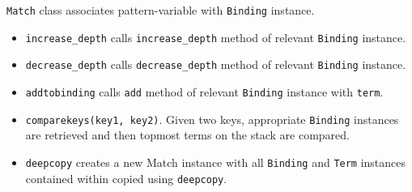 \texttt{Match} class associates pattern-variable with \texttt{Binding} instance.

\begin{itemize}
\item
\texttt{increase\_depth} calls \texttt{increase\_depth} method of relevant \texttt{Binding} instance.

\item
\texttt{decrease\_depth} calls \texttt{decrease\_depth} method of relevant \texttt{Binding} instance.

\item
\texttt{addtobinding} calls \texttt{add} method of relevant \texttt{Binding} instance with \texttt{term}.

\item
\texttt{comparekeys(key1, key2)}. Given two keys, appropriate \texttt{Binding} instances are retrieved and then topmost terms on the stack are compared.

\item
\texttt{deepcopy} creates a new Match instance with all \texttt{Binding} and \texttt{Term} instances contained within copied using \texttt{deepcopy}.
\end{itemize}

